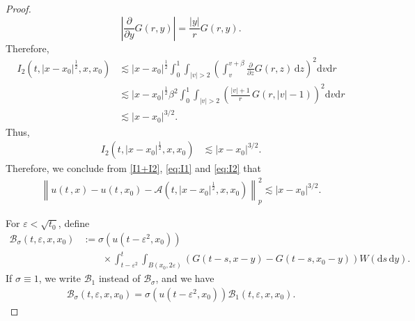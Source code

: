 \documentclass[12pt,a4paper]{article}
\newcommand{\cB}{{\mathcal{B}}}
\newcommand{\R}{{\mathbb{R}}}
\renewcommand{\d}{\mathrm{d}}
\newcommand {\half}{\frac 12}
\newcommand{\<}{\langle}
\renewcommand{\>}{\rangle}
\begin{document}
\begin{proof}
\begin{equation*}
    \left\vert \frac{\partial}{\partial y} G(r, y) \right\vert = \frac{\vert y \vert}{r} G(r, y).
\end{equation*} 
Therefore,
\begin{align*}
           I_2(t, |x-x_0|^\half, x, x_0) &\lesssim  |x-x_0|^\half   \int^{1}_{0}\int_{|v|>2} \left(\int_v^{v + \beta} \frac{\partial}{\partial z} G(r, z)\,  \d z \right)^2 \d v \d r\\
             &\lesssim  |x-x_0|^{\half}  \beta^2 \int^{1}_{0}\int_{|v|>2} \left(\frac{\vert v \vert + 1}{r} \, G(r, \vert v \vert - 1 )\right)^2\d v\d r \\
             & \lesssim |x-x_0|^{3/2}.
\end{align*}
Thus, 
\begin{align}\label{eq:I2}
          I_2(t, |x-x_0|^\half, x, x_0) &\lesssim |x-x_0|^{3/2}.
\end{align} 
Therefore, we conclude from \eqref{I1+I2}, \eqref{eq:I1} and \eqref{eq:I2} that 
\begin{align}\label{eq:u-A}
           \left\|u(t\,,x)- u(t\,,x_0) - \mathcal{A}(t,|x-x_0|^\half, x, x_0)\right\|^2_p \lesssim |x-x_0|^{3/2}.
\end{align}
       
For $\varepsilon <\sqrt{t_0}$, define
\begin{align*}
           \mathcal{B}_\sigma(t, \varepsilon, x, x_0)&:= \sigma(u(t-\varepsilon^2, x_0)) \\
           &\qquad \times \int_{t-\varepsilon^2}^t\int_{B(x_0, 2\varepsilon)} (G(t-s, x-y)- G(t-s, x_0-y)) W(\d s\, \d y).
\end{align*}
If $\sigma \equiv 1$, we write $\cB_1$ instead of $\cB_\sigma$, and we have 
\begin{align*}
     \cB_\sigma(t, \varepsilon, x, x_0) = \sigma(u(t-\varepsilon^2,x_0)) \cB_1(t, \varepsilon, x, x_0) .
\end{align*}


\end{proof}
\end{document}

